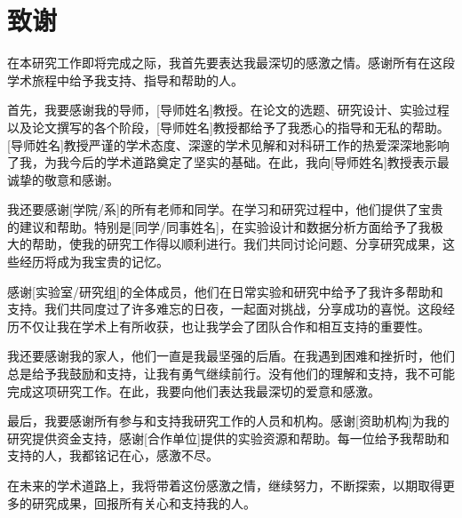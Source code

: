\documentclass[../main.tex]{subfiles}
\begin{document}
\chapter*{致谢}

\normalsize

在本研究工作即将完成之际，我首先要表达我最深切的感激之情。感谢所有在这段学术旅程中给予我支持、指导和帮助的人。

首先，我要感谢我的导师，[导师姓名]教授。在论文的选题、研究设计、实验过程以及论文撰写的各个阶段，[导师姓名]教授都给予了我悉心的指导和无私的帮助。[导师姓名]教授严谨的学术态度、深邃的学术见解和对科研工作的热爱深深地影响了我，为我今后的学术道路奠定了坚实的基础。在此，我向[导师姓名]教授表示最诚挚的敬意和感谢。

我还要感谢[学院/系]的所有老师和同学。在学习和研究过程中，他们提供了宝贵的建议和帮助。特别是[同学/同事姓名]，在实验设计和数据分析方面给予了我极大的帮助，使我的研究工作得以顺利进行。我们共同讨论问题、分享研究成果，这些经历将成为我宝贵的记忆。

感谢[实验室/研究组]的全体成员，他们在日常实验和研究中给予了我许多帮助和支持。我们共同度过了许多难忘的日夜，一起面对挑战，分享成功的喜悦。这段经历不仅让我在学术上有所收获，也让我学会了团队合作和相互支持的重要性。

我还要感谢我的家人，他们一直是我最坚强的后盾。在我遇到困难和挫折时，他们总是给予我鼓励和支持，让我有勇气继续前行。没有他们的理解和支持，我不可能完成这项研究工作。在此，我要向他们表达我最深切的爱意和感激。

最后，我要感谢所有参与和支持我研究工作的人员和机构。感谢[资助机构]为我的研究提供资金支持，感谢[合作单位]提供的实验资源和帮助。每一位给予我帮助和支持的人，我都铭记在心，感激不尽。

在未来的学术道路上，我将带着这份感激之情，继续努力，不断探索，以期取得更多的研究成果，回报所有关心和支持我的人。
\end{document}

